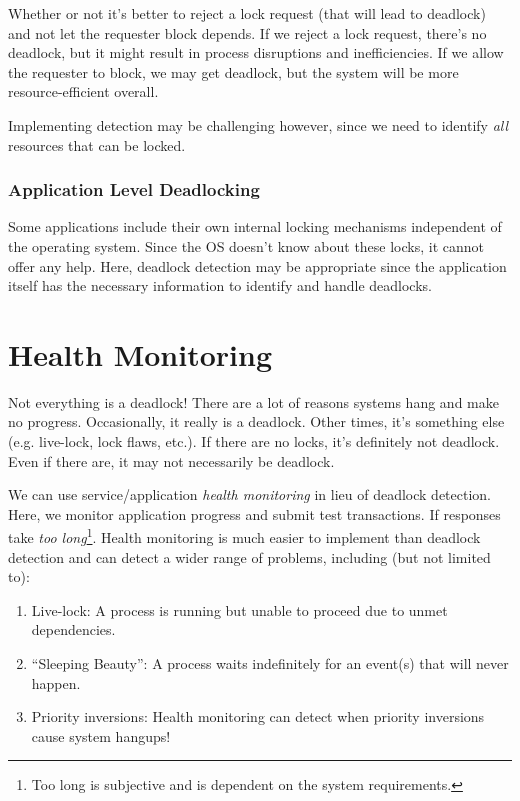 \documentclass{report}
\begin{document}
Whether or not it's better to reject a lock request (that will lead to deadlock) and not let the
requester block depends. If we reject a lock request, there's no deadlock, but it might result in
process disruptions and inefficiencies. If we allow the requester to block, we may get deadlock, but
the system will be more resource-efficient overall. 

Implementing detection may be challenging however, since we need to identify \textit{all} resources
that can be locked.


\subsubsection{Application Level Deadlocking}
Some applications include their own internal locking mechanisms independent of the operating
system. Since the OS doesn't know about these locks, it cannot offer any help. Here, deadlock
detection may be appropriate since the application itself has the necessary information to identify
and handle deadlocks.


\section{Health Monitoring}
Not everything is a deadlock! There are a lot of reasons systems hang and make no
progress. Occasionally, it really is a deadlock. Other times, it's something else (e.g. live-lock,
lock flaws, etc.). If there are no locks, it's definitely not deadlock. Even if there are, it may
not necessarily be deadlock.

We can use service/application \textit{health monitoring} in lieu of deadlock detection. Here, we
monitor application progress and submit test transactions. If responses take \textit{too
  long}\footnote{Too long is subjective and is dependent on the system requirements.}. Health
monitoring is much easier to implement than deadlock detection and can detect a wider range of
problems, including (but not limited to):

\begin{enumerate}[label=\textit{(\roman*)}]
\item Live-lock: A process is running but unable to proceed due to unmet dependencies.
\item ``Sleeping Beauty'': A process waits indefinitely for an event(s) that will never happen.
\item Priority inversions: Health monitoring can detect when priority inversions cause system
  hangups!
\end{enumerate}
\end{document}
